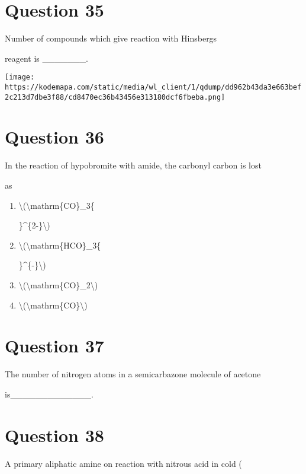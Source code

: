 \documentclass{article}
\begin{document}
\section*{Question 35}
Number of compounds which give reaction with Hinsberg\textquotesingle s

reagent is \_\_\_\_\_\_\_.



\texttt{[image: https://kodemapa.com/static/media/wl\_client/1/qdump/dd962b43da3e663bef2c213d7dbe3f88/cd8470ec36b43456e313180dcf6fbeba.png]}\\



\hfill\break


\begin{enumerate}[label=(\alph*)]
\end{enumerate}
\newpage
\section*{Question 36}
In the reaction of hypobromite with amide, the carbonyl carbon is lost

as


\begin{enumerate}[label=(\alph*)]
\item \textbackslash(\textbackslash mathrm\{CO\}\_3\{

\}\^{}\{2-\}\textbackslash)


\item \textbackslash(\textbackslash mathrm\{HCO\}\_3\{

\}\^{}\{-\}\textbackslash)


\item \textbackslash(\textbackslash mathrm\{CO\}\_2\textbackslash)


\item \textbackslash(\textbackslash mathrm\{CO\}\textbackslash)


\end{enumerate}
\newpage
\section*{Question 37}
The number of nitrogen atoms in a semicarbazone molecule of acetone

is\_\_\_\_\_\_\_\_\_\_\_\_\_.


\begin{enumerate}[label=(\alph*)]
\end{enumerate}
\newpage
\section*{Question 38}
A primary aliphatic amine on reaction with nitrous acid in cold (
\end{document}
